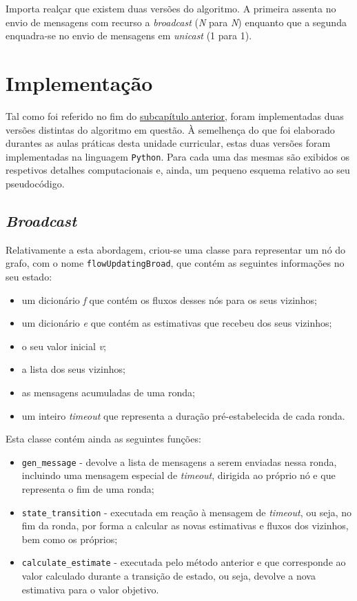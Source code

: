 \documentclass[a4paper]{report}
\begin{document}
{	Importa realçar que existem duas versões do algoritmo. A primeira assenta no envio de mensagens com recurso a \textit{broadcast} (\textit{N} para \textit{N}) enquanto que a segunda enquadra-se no envio de mensagens em \textit{unicast} (1 para 1).


	\section{Implementação} \label{sec:Implementation}
	Tal como foi referido no fim do \hyperref[sec:Concept]{subcapítulo anterior}, foram implementadas duas versões distintas do algoritmo em questão.
	À semelhença do que foi elaborado durantes as aulas práticas desta unidade curricular, estas duas versões foram implementadas na linguagem \texttt{Python}.
	Para cada uma das mesmas são exibidos os respetivos detalhes computacionais e, ainda, um pequeno esquema relativo ao seu pseudocódigo.

		\subsection{\textit{Broadcast}} \label{subsec:Broadcast}
		Relativamente a esta abordagem, criou-se uma classe para representar um nó do grafo, com o nome \texttt{flowUpdatingBroad}, que contém as seguintes informações no seu estado:
		\begin{itemize}
			\item um dicionário \textit{f} que contém os fluxos desses nós para os seus vizinhos;
			\item um dicionário \textit{e} que contém as estimativas que recebeu dos seus vizinhos;
			\item o seu valor inicial \textit{v};
			\item a lista dos seus vizinhos;
			\item as mensagens acumuladas de uma ronda;
			\item um inteiro \textit{timeout} que representa a duração pré-estabelecida de cada ronda.
		\end{itemize}

		Esta classe contém ainda as seguintes funções:
		\begin{itemize}
			\item \texttt{gen\_message} - devolve a lista de mensagens a serem enviadas nessa ronda, incluindo uma mensagem especial de \textit{timeout}, dirigida ao próprio nó e que representa o fim de uma ronda;
			\item \texttt{state\_transition} - executada em reação à mensagem de \textit{timeout}, ou seja, no fim da ronda, por forma a calcular as novas estimativas e fluxos dos vizinhos, bem como os próprios;
			\item \texttt{calculate\_estimate} - executada pelo método anterior e que corresponde ao valor calculado durante a transição de estado, ou seja, devolve a nova estimativa para o valor objetivo.
		\end{itemize}

}
\end{document}
